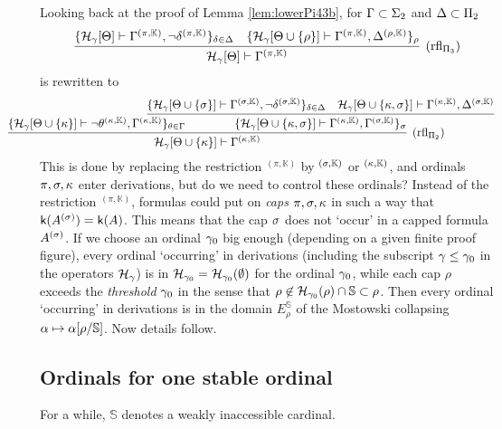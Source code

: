 \documentclass{article}
\newcommand{\mS}{\mathbb{S}}
\newcommand{\mK}{\mathbb{K}}
\begin{document}
Looking back at the proof of Lemma \ref{lem:lowerPi43b},
for $\Gamma\subset\Sigma_{2}$ and $\Delta\subset\Pi_{2}$
{\small
\[
\infer[({\rm rfl}_{\Pi_{3}})]{
\calh_{\gam}[\Tht]\vdash\Gam^{(\pi,\mK)}
}
{
\{
\mathcal{H}_{\gam}[\Tht]\vdash\Gamma^{(\pi,\mK)}, \lnot\del^{(\pi,\mK)}
\}_{\del\in\Del}
&
\{
\mathcal{H}_{\gam}[\Tht\cup \{\rho\}]\vdash\Gamma^{(\pi,\mK)}, 
\Del^{(\rho,\mK)}
\}_{\rho}
}
\]
}
 is rewritten to
{\small
\[
\hspace{-10mm}
\infer[({\rm rfl}_{\Pi_{2}})]{\mathcal{H}_{\gam}[\Tht\cup \{\kap\}]\vdash\Gam^{(\kap,\mK)}}
{
\{\mathcal{H}_{\gam}[\Tht\cup \{\kap\}]\vdash\lnot\tht^{(\kap,\mK)},\Gam^{(\kap,\mK)}\}_{\tht\in\Gam}
&
\hspace{-15mm}
\infer{
\{\mathcal{H}_{\gam}[\Tht\cup \{\kap,\sig\}]\vdash
\Gamma^{(\kap,\mK)},\Gam^{(\sig,\mK)}\}_{\sig}
}
 {
 \{
 \mathcal{H}_{\gam}[\Tht\cup \{\sig\}]\vdash\Gamma^{(\sig,\mK)}, \lnot \del^{(\sig,\mK)}
 \}_{\del\in\Del}
 &
 \mathcal{H}_{\gam}[\Tht\cup \{\kap,\sig\}]\vdash\Gamma^{(\kap,\mK)}, 
\Del^{(\sig,\mK)}
 }
}
\]
}
This is done by replacing the restriction ${}^{(\pi,\mK)}$ by ${}^{(\sig,\mK)}$ or ${}^{(\kap,\mK)}$, and
ordinals $\pi,\sigma,\kappa$ enter derivations, but do we need to control these ordinals?
Instead of the restriction ${}^{(\pi,\mK)}$, formulas could put on \textit{caps} $\pi,\sigma,\kappa$
in such a way that ${\sf k}(A^{(\sigma)})={\sf k}(A)$.
This means that the cap $\sigma$ does not `occur' in a capped formula $A^{(\sigma)}$.
If we choose an ordinal $\gamma_{0}$ big enough (depending on a given finite proof figure),
 every ordinal `occurring' in derivations (including the subscript $\gamma\leq\gamma_{0}$ in
the operators ${\cal H}_{\gamma}$)
 is in ${\cal H}_{\gamma_{0}}={\cal H}_{\gamma_{0}}(\emptyset)$
for the ordinal $\gamma_{0}$, while
each cap $\rho$ exceeds the \textit{threshold} $\gamma_{0}$ in the sense that
$\rho\not\in\calh_{\gam_{0}}(\rho)\cap\mS\subset\rho$.
Then every ordinal `occurring' in derivations is in the domain $E^{\mS}_{\rho}$
of the Mostowski collapsing $\alp\mapsto\alp[\rho/\mS]$.
Now details follow.










\subsection{Ordinals for one stable ordinal}\label{sect:ordinalnotation}


For a while, $\mS$ denotes a weakly inaccessible cardinal.
\end{document}

